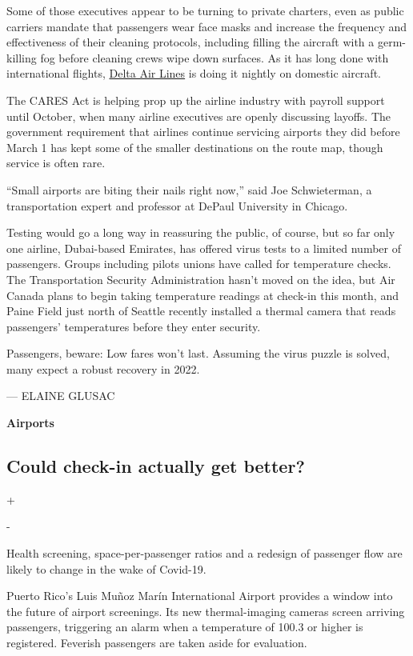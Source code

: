 Some of those executives appear to be turning to private charters, even
as public carriers mandate that passengers wear face masks and increase
the frequency and effectiveness of their cleaning protocols, including
filling the aircraft with a germ-killing fog before cleaning crews wipe
down surfaces. As it has long done with international flights,
\href{https://news.delta.com/coronavirus-update-aircraft-fogging-enhances-customer-safety}{Delta
Air Lines} is doing it nightly on domestic aircraft.

The CARES Act is helping prop up the airline industry with payroll
support until October, when many airline executives are openly
discussing layoffs. The government requirement that airlines continue
servicing airports they did before March 1 has kept some of the smaller
destinations on the route map, though service is often rare.

``Small airports are biting their nails right now,'' said Joe
Schwieterman, a transportation expert and professor at DePaul University
in Chicago.

Testing would go a long way in reassuring the public, of course, but so
far only one airline, Dubai-based Emirates, has offered virus tests to a
limited number of passengers. Groups including pilots unions have called
for temperature checks. The Transportation Security Administration
hasn't moved on the idea, but Air Canada plans to begin taking
temperature readings at check-in this month, and Paine Field just north
of Seattle recently installed a thermal camera that reads passengers'
temperatures before they enter security.

Passengers, beware: Low fares won't last. Assuming the virus puzzle is
solved, many expect a robust recovery in 2022.

--- ELAINE GLUSAC

\textbf{Airports}

\hypertarget{could-check-in-actually-get-better}{%
\subsection{Could check-in actually get
better?}\label{could-check-in-actually-get-better}}

+

-

Health screening, space-per-passenger ratios and a redesign of passenger
flow are likely to change in the wake of Covid-19.

Puerto Rico's Luis Muñoz Marín International Airport provides a window
into the future of airport screenings. Its new thermal-imaging cameras
screen arriving passengers, triggering an alarm when a temperature of
100.3 or higher is registered. Feverish passengers are taken aside for
evaluation.


